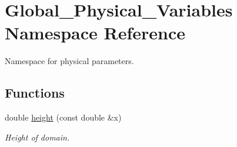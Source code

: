 \hypertarget{namespaceGlobal__Physical__Variables}{}\section{Global\+\_\+\+Physical\+\_\+\+Variables Namespace Reference}
\label{namespaceGlobal__Physical__Variables}


Namespace for physical parameters.  


\subsection*{Functions}
\begin{DoxyCompactItemize}
\item 
double \hyperlink{namespaceGlobal__Physical__Variables_aad3f0468efff43e7f235a64c27d3acf2}{height} (const double \&x)
\begin{DoxyCompactList}\small\item\em Height of domain. \end{DoxyCompactList}\end{DoxyCompactItemize}
